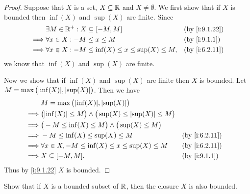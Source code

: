 \begin{proof}
  Suppose that \(X\) is a set, \(X \subseteq \mathbb{R}\) and \(X \neq \emptyset\).
  We first show that if \(X\) is bounded then \(\inf(X)\) and \(\sup(X)\) are finite.
  Since
  \begin{align*}
             & \exists M \in \R^+ : X \subseteq [-M, M]                      &  & \by{i:9.1.22} \\
    \implies & \forall x \in X : -M \leq x \leq M                            &  & \by{i:9.1.1}  \\
    \implies & \forall x \in X : -M \leq \inf(X) \leq x \leq \sup(X) \leq M, &  & \by{i:6.2.11}
  \end{align*}
  we know that \(\inf(X)\) and \(\sup(X)\) are finite.

  Now we show that if \(\inf(X)\) and \(\sup(X)\) are finite then \(X\) is bounded.
  Let \(M = \max\big(\abs{\inf(X)}, \abs{\sup(X)}\big)\).
  Then we have
  \begin{align*}
             & M = \max\big(\abs{\inf(X)}, \abs{\sup(X)}\big)                                                      \\
    \implies & \big(\abs{\inf(X)} \leq M\big) \land \big(\sup(X) \leq \abs{\sup(X)} \leq M\big)                    \\
    \implies & \big(-M \leq \inf(X) \leq M\big) \land \big(\sup(X) \leq M\big)                                     \\
    \implies & -M \leq \inf(X) \leq \sup(X) \leq M                                              &  & \by{i:6.2.11} \\
    \implies & \forall x \in X, -M \leq \inf(X) \leq x \leq \sup(X) \leq M                      &  & \by{i:6.2.11} \\
    \implies & X \subseteq [-M, M].                                                             &  & \by{i:9.1.1}
  \end{align*}
  Thus by \cref{i:9.1.22} \(X\) is bounded.
\end{proof}

\begin{ex}\label{i:ex:9.1.11}
  Show that if \(X\) is a bounded subset of \(\mathbb{R}\), then the closure \(X\) is also bounded.
\end{ex}

